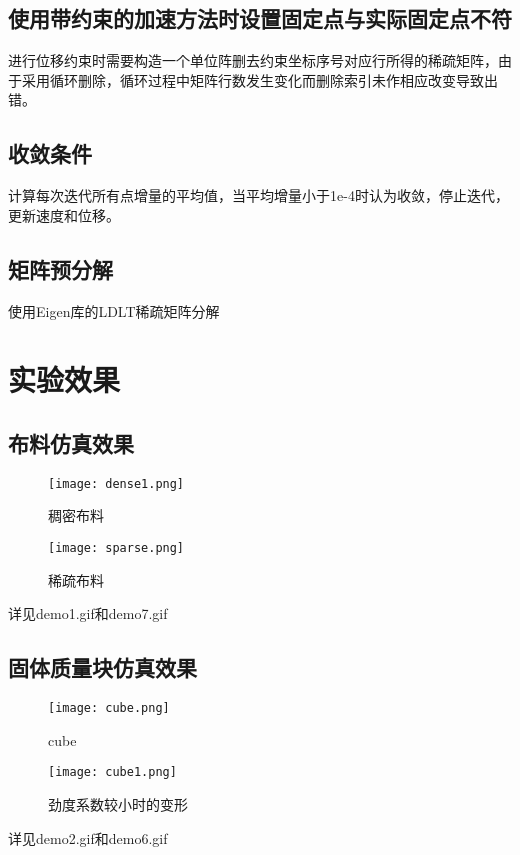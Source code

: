 \documentclass[14pt]{scrartcl} %
\begin{document}
\subsection{使用带约束的加速方法时设置固定点与实际固定点不符}
进行位移约束时需要构造一个单位阵删去约束坐标序号对应行所得的稀疏矩阵，由于采用循环删除，循环过程中矩阵行数发生变化而删除索引未作相应改变导致出错。

\subsection{收敛条件}
计算每次迭代所有点增量的平均值，当平均增量小于1e-4时认为收敛，停止迭代，更新速度和位移。

\subsection{矩阵预分解}
使用Eigen库的LDLT稀疏矩阵分解

\pagebreak

\section{实验效果}

\subsection{布料仿真效果}
\begin{figure}[h] %
	\centering
	\texttt{[image: dense1.png]} %
	\caption{稠密布料}
\end{figure}
\begin{figure}[h] %
	\centering
	\texttt{[image: sparse.png]} %
	\caption{稀疏布料}
\end{figure}

详见demo1.gif和demo7.gif
\pagebreak
\subsection{固体质量块仿真效果}
\begin{figure}[h] %
	\centering
	\texttt{[image: cube.png]} %
	\caption{cube}
\end{figure}
\begin{figure}[h] %
	\centering
	\texttt{[image: cube1.png]} %
	\caption{劲度系数较小时的变形}
\end{figure}
详见demo2.gif和demo6.gif
\end{document}
